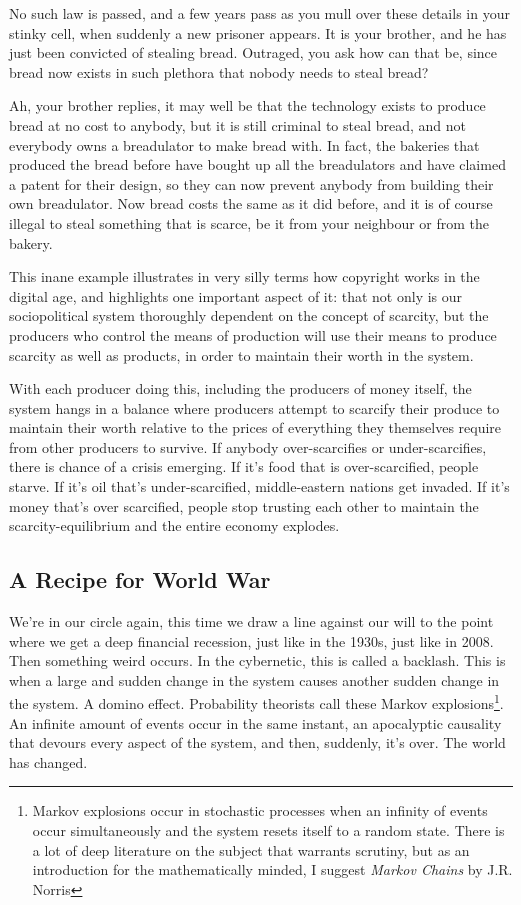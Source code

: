 No such law is passed, and a few years pass as you mull over these details in
your stinky cell, when suddenly a new prisoner appears. It is your brother, and
he has just been convicted of stealing bread. Outraged, you ask how can that 
be, since bread now exists in such plethora that nobody needs to steal bread?

Ah, your brother replies, it may well be that the technology exists to produce
bread at no cost to anybody, but it is still criminal to steal bread, and not
everybody owns a breadulator to make bread with. In fact, the bakeries that
produced the bread before have bought up all the breadulators and have claimed 
a patent for their design, so they can now prevent anybody from building their
own breadulator. Now bread costs the same as it did before, and it is of course
illegal to steal something that is scarce, be it from your neighbour or from 
the bakery.

This inane example illustrates in very silly terms how copyright works in the
digital age, and highlights one important aspect of it: that not only is our
sociopolitical system thoroughly dependent on the concept of scarcity, but the
producers who control the means of production will use their means to produce
scarcity as well as products, in order to maintain their worth in the system.

With each producer doing this, including the producers of money itself, the
system hangs in a balance where producers attempt to scarcify their produce to
maintain their worth relative to the prices of everything they themselves
require from other producers to survive. If anybody over-scarcif\hbox{}ies or
under-scarcif\hbox{}ies, there is chance of a crisis emerging. If it's food 
that is over-scarcif\hbox{}ied, people starve. If it's oil that's
under-scarcif\hbox{}ied, middle-eastern nations get invaded. If it's money
that's over scarcif\hbox{}ied, people stop trusting each other to maintain the
scarcity-equilibrium and the entire economy explodes.


\subsection{A Recipe for World War}
\label{s:artificial_scarcity:unspoken_mythology:world_war}

We're in our circle again, this time we draw a line against our will to the
point where we get a deep f\hbox{}inancial recession, just like in the 1930s,
just like in 2008. Then something weird occurs. In the cybernetic, this is
called a backlash. This is when a large and sudden change in the system causes
another sudden change in the system. A domino ef\hbox{}fect. Probability
theorists call these Markov explosions\footnote{Markov explosions occur in
stochastic processes when an inf\hbox{}inity of events occur simultaneously and
the system resets itself to a random state. There is a lot of deep literature 
on the subject that warrants scrutiny, but as an introduction for the
mathematically minded, I suggest \textit{Markov Chains} by J.R. Norris}. An
inf\hbox{}inite amount of events occur in the same instant, an apocalyptic
causality that devours every aspect of the system, and then, suddenly, it's
over. The world has changed.

